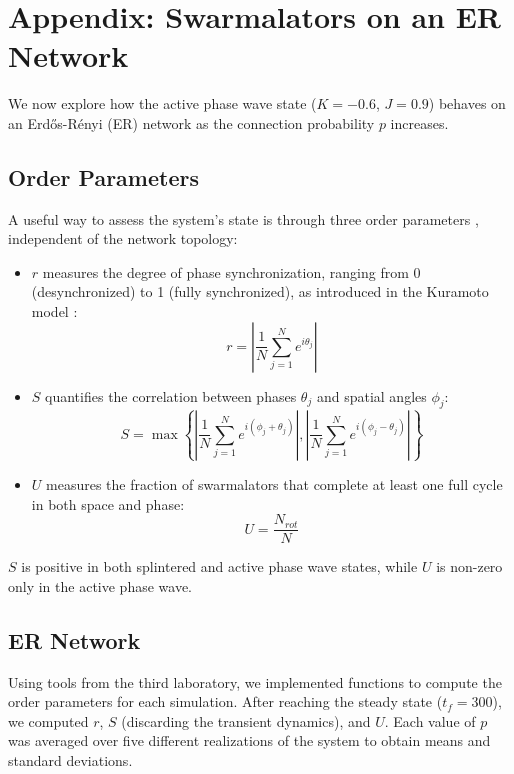\chapter*{Appendix: Swarmalators on an ER Network}
We now explore how the active phase wave state ($K = -0.6$, $J = 0.9$) behaves on an Erdős-Rényi (ER) network as the connection probability $p$ increases.

\section{Order Parameters}
A useful way to assess the system's state is through three order parameters \cite{O_Keeffe_2017}, independent of the network topology:
\begin{itemize}
    \item \( r \) measures the degree of phase synchronization, ranging from 0 (desynchronized) to 1 (fully synchronized), as introduced in the Kuramoto model \cite{Acebron_2005}:
    \begin{equation}
        r = \left| \frac{1}{N} \sum_{j=1}^{N} e^{i \theta_j} \right|
        \label{equation::r}
    \end{equation}
    \item \( S \) quantifies the correlation between phases \( \theta_j \) and spatial angles \( \phi_j \):
    \begin{equation}
        S = \max \left\{  \left| \frac{1}{N} \sum_{j=1}^{N} e^{i (\phi_j+\theta_j)} \right|, \left| \frac{1}{N} \sum_{j=1}^{N} e^{i (\phi_j-\theta_j)} \right| \right\}
        \label{equation::S}
    \end{equation}
    \item \( U \) measures the fraction of swarmalators that complete at least one full cycle in both space and phase:
    \begin{equation}
        U = \frac{N_{rot}}{N}
        \label{equation::U}
    \end{equation}
\end{itemize}
\( S \) is positive in both splintered and active phase wave states, while \( U \) is non-zero only in the active phase wave.

\newpage
\section{ER Network}
Using tools from the third laboratory, we implemented functions to compute the order parameters for each simulation. After reaching the steady state ($t_f = 300$), we computed \( r \), \( S \) (discarding the transient dynamics), and \( U \). Each value of $p$ was averaged over five different realizations of the system to obtain means and standard deviations.

